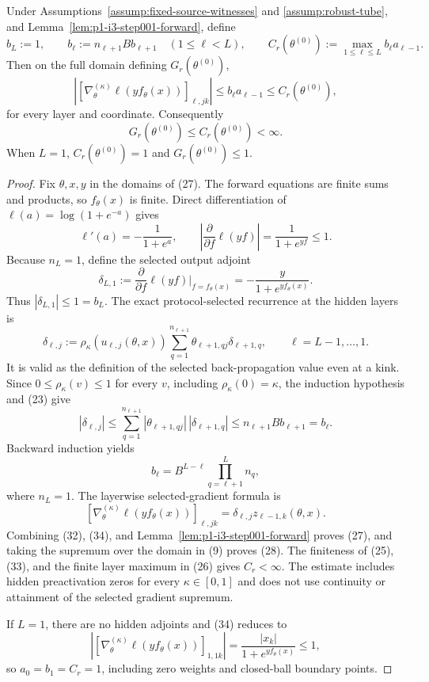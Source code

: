 \begin{proposition}
\label{prop:p1-i3-step001-gradient}
Under Assumptions~\ref{assump:fixed-source-witnesses} and
\ref{assump:robust-tube}, and Lemma~\ref{lem:p1-i3-step001-forward}, define
\[
b_L:=1,
\qquad b_\ell:=n_{\ell+1}B b_{\ell+1}\quad(1\leq\ell<L),
\qquad
C_r(\theta^{(0)}):=\max_{1\leq\ell\leq L}b_\ell a_{\ell-1}.
\tag{26}
\]
Then on the full domain defining $G_r(\theta^{(0)})$,
\[
\left|
[\nabla_\theta^{(\kappa)}\ell(yf_\theta(x))]_{\ell,jk}
\right|
\leq b_\ell a_{\ell-1}\leq C_r(\theta^{(0)}),
\tag{27}
\]
for every layer and coordinate.  Consequently
\[
G_r(\theta^{(0)})\leq C_r(\theta^{(0)})<\infty.
\tag{28}
\]
When $L=1$, $C_r(\theta^{(0)})=1$ and $G_r(\theta^{(0)})\leq1$.
\end{proposition}

\begin{proof}
Fix $\theta,x,y$ in the domains of (27).  The forward equations are finite
sums and products, so $f_\theta(x)$ is finite.  Direct differentiation of
$\ell(a)=\log(1+e^{-a})$ gives
\[
\ell'(a)=-\frac1{1+e^a},
\qquad
\left|\frac{\partial}{\partial f}\ell(yf)\right|
=\frac1{1+e^{yf}}\leq1.
\tag{29}
\]
Because $n_L=1$, define the selected output adjoint
\[
\delta_{L,1}:=\frac{\partial}{\partial f}\ell(yf)\bigg|_{f=f_\theta(x)}
=-\frac{y}{1+e^{yf_\theta(x)}}.
\tag{30}
\]
Thus $|\delta_{L,1}|\leq1=b_L$.  The exact protocol-selected recurrence at
the hidden layers is
\[
\delta_{\ell,j}:=\rho_\kappa(u_{\ell,j}(\theta,x))
\sum_{q=1}^{n_{\ell+1}}
\theta_{\ell+1,qj}\delta_{\ell+1,q},
\qquad \ell=L-1,\ldots,1.
\tag{31}
\]
It is valid as the definition of the selected back-propagation value even at
a kink.  Since $0\leq\rho_\kappa(v)\leq1$ for every $v$, including
$\rho_\kappa(0)=\kappa$, the induction hypothesis and (23) give
\[
|\delta_{\ell,j}|
\leq\sum_{q=1}^{n_{\ell+1}}
|\theta_{\ell+1,qj}|\,|\delta_{\ell+1,q}|
\leq n_{\ell+1}B b_{\ell+1}=b_\ell.
\tag{32}
\]
Backward induction yields
\[
b_\ell=B^{L-\ell}\prod_{q=\ell+1}^{L}n_q,
\tag{33}
\]
where $n_L=1$.  The layerwise selected-gradient formula is
\[
[\nabla_\theta^{(\kappa)}\ell(yf_\theta(x))]_{\ell,jk}
=\delta_{\ell,j}z_{\ell-1,k}(\theta,x).
\tag{34}
\]
Combining (32), (34), and Lemma~\ref{lem:p1-i3-step001-forward} proves
(27), and taking the supremum over the domain in (9) proves (28).  The
finiteness of (25), (33), and the finite layer maximum in (26) gives
$C_r<\infty$.  The estimate includes hidden preactivation zeros for every
$\kappa\in[0,1]$ and does not use continuity or attainment of the selected
gradient supremum.

If $L=1$, there are no hidden adjoints and (34) reduces to
\[
\left|[\nabla_\theta^{(\kappa)}\ell(yf_\theta(x))]_{1,1k}\right|
=\frac{|x_k|}{1+e^{yf_\theta(x)}}\leq1,
\tag{35}
\]
so $a_0=b_1=C_r=1$, including zero weights and closed-ball boundary points.
\end{proof}

